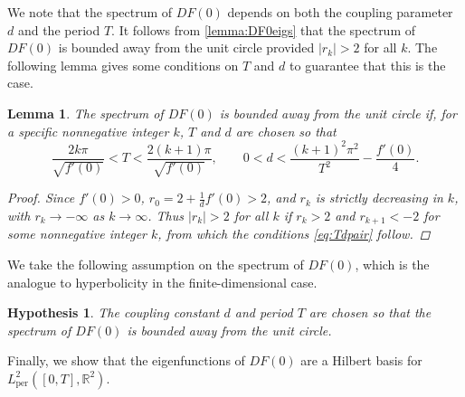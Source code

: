 \documentclass[12pt,reqno]{amsart}
\def\R{{\mathbb R}}
\def\per{\textrm{per}}
\newtheorem{lemma}{Lemma}
\newtheorem{hypothesis}{Hypothesis}
\begin{document}
We note that the spectrum of $DF(0)$ depends on both the coupling parameter $d$ and the period $T$. It follows from \cref{lemma:DF0eigs} that the spectrum of $DF(0)$ is bounded away from the unit circle provided $|r_k| > 2$ for all $k$. The following lemma gives some conditions on $T$ and $d$ to guarantee that this is the case.

\begin{lemma}\label{lemma:DF0hyp}
The spectrum of $DF(0)$ is bounded away from the unit circle if, for a specific nonnegative integer $k$, $T$ and $d$ are chosen so that
\begin{equation}\label{eq:Tdpair}
\frac{2 k \pi}{\sqrt{f'(0)}} < T < \frac{2 (k+1) \pi}{\sqrt{f'(0)}} , \qquad 0 < d < \frac{(k+1)^2\pi^2}{T^2} - \frac{f'(0)}{4}.
\end{equation}
\begin{proof}
Since $f'(0) > 0$, $r_0 = 2 + \frac{1}{d}f'(0) > 2$, and $r_k$ is strictly decreasing in $k$, with $r_k \rightarrow -\infty$ as $k \rightarrow \infty$. Thus $|r_k| > 2$ for all $k$ if $r_k > 2$ and $r_{k+1} < -2$ for some nonnegative integer $k$, from which the conditions \cref{eq:Tdpair} follow.
\end{proof}
\end{lemma}

We take the following assumption on the spectrum of $DF(0)$, which is the analogue to hyperbolicity in the finite-dimensional case.

\begin{hypothesis}\label{hyp:hyp}
The coupling constant $d$ and period $T$ are chosen so that the spectrum of $DF(0)$ is bounded away from the unit circle.
\end{hypothesis}

Finally, we show that the eigenfunctions of $DF(0)$ are a Hilbert basis for $L^2_\per([0,T],\R^2)$.
\end{document}
